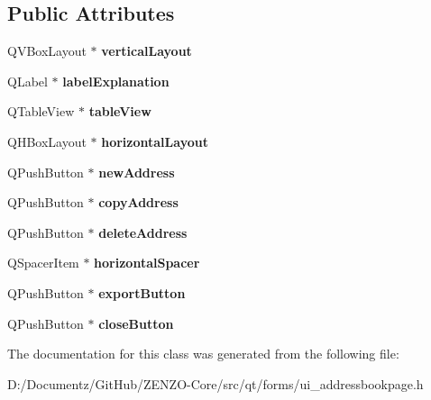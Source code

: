 \subsection*{Public Attributes}
\begin{DoxyCompactItemize}
\item 
\mbox{\label{class_ui___address_book_page_af39caf99dc3645ef7b7c962a35b5a8b4}} 
Q\+V\+Box\+Layout $\ast$ {\bfseries vertical\+Layout}
\item 
\mbox{\label{class_ui___address_book_page_a1eeb215eed8cb52e146d1fea90570ff7}} 
Q\+Label $\ast$ {\bfseries label\+Explanation}
\item 
\mbox{\label{class_ui___address_book_page_ac3d6da4274170077aae89f567660b775}} 
Q\+Table\+View $\ast$ {\bfseries table\+View}
\item 
\mbox{\label{class_ui___address_book_page_aefe1d8100918626005ecdf793ab698c6}} 
Q\+H\+Box\+Layout $\ast$ {\bfseries horizontal\+Layout}
\item 
\mbox{\label{class_ui___address_book_page_a1353e64161511761c1744a447c37cb29}} 
Q\+Push\+Button $\ast$ {\bfseries new\+Address}
\item 
\mbox{\label{class_ui___address_book_page_a93cd610e9c445ec79844ce6d86128d5d}} 
Q\+Push\+Button $\ast$ {\bfseries copy\+Address}
\item 
\mbox{\label{class_ui___address_book_page_aea2ba4a0a7b9ca912d67eccba92c7198}} 
Q\+Push\+Button $\ast$ {\bfseries delete\+Address}
\item 
\mbox{\label{class_ui___address_book_page_a907c8deb7de7c2f646e24297cc122dda}} 
Q\+Spacer\+Item $\ast$ {\bfseries horizontal\+Spacer}
\item 
\mbox{\label{class_ui___address_book_page_ae7811479643a90bfe3a823ddc9f20708}} 
Q\+Push\+Button $\ast$ {\bfseries export\+Button}
\item 
\mbox{\label{class_ui___address_book_page_af0f4048b797d4a16234c259f70da57d5}} 
Q\+Push\+Button $\ast$ {\bfseries close\+Button}
\end{DoxyCompactItemize}


The documentation for this class was generated from the following file\+:\begin{DoxyCompactItemize}
\item 
D\+:/\+Documentz/\+Git\+Hub/\+Z\+E\+N\+Z\+O-\/\+Core/src/qt/forms/ui\+\_\+addressbookpage.\+h\end{DoxyCompactItemize}

